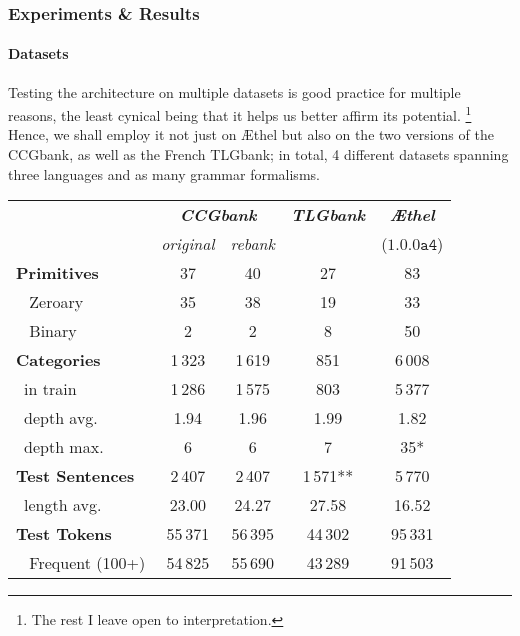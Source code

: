 \subsubsection{Experiments \& Results}
\paragraph{Datasets}
Testing the architecture on multiple datasets is good practice for multiple reasons, the least cynical being that it helps us better affirm its potential.%
	\footnote{The rest I leave open to interpretation.}
Hence, we shall employ it not just on \AE thel but also on the two versions of the CCGbank, as well as the French TLGbank; in total, 4 different datasets spanning three languages and as many grammar formalisms.

\begin{table}
    \centering
    \small{
    \begin{tabular}{@{}l@{\qquad}c@{\quad}c@{\qquad}c@{\qquad}c@{}}
        & \multicolumn{2}{c}{\textbf{\textit{CCGbank}}} 
        & \textbf{\textit{TLGbank}}
        & \textbf{\textit{\AE thel}}\\ 
        & \textit{original} & \textit{rebank} & & ($\mathtt{1.0.0a4}$)\\
        \toprule
        \textbf{Primitives}     & 37        & 40        & 27        & 83\\
        ~ Zeroary           & 35        & 38        & 19        & 33\\ 
        ~ Binary            & 2         & 2         & 8         & 50\\
        \midrule
        \textbf{Categories}     & 1\,323      & 1\,619      & 851      & 6\,008\\
        ~{in train}         & 1\,286      & 1\,575      & 803      & 5\,377\\
        ~{depth avg.}       & 1.94      & 1.96      & 1.99     &   1.82\\
        ~{depth max.}       & 6         & 6         & 7        & 35*\\ 
        \midrule
        \textbf{Test Sentences} & 2\,407      & 2\,407      & 1\,571**    & 5\,770 \\
        ~{length avg.}      & 23.00     & 24.27     & 27.58    &  16.52\\
        \midrule
        \textbf{Test Tokens}    & 55\,371     & 56\,395     & 44\,302     & 95\,331\\
        ~ Frequent {(100+)}   & 54\,825     & 55\,690     & 43\,289     & 91\,503\\

\end{tabular}}
\end{table}
